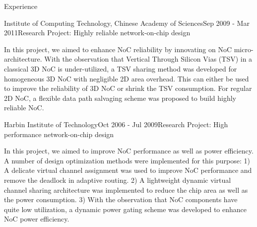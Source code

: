 \documentclass{resume} %
\begin{document}
\begin{rSection}{Experience}

\begin{rSubsection}{Institute of Computing Technology, Chinese Academy of Sciences}{Sep 2009 - Mar 2011}{Research Project: Highly reliable network-on-chip design}{}
\item In this project, we aimed to enhance NoC reliability by innovating on NoC micro-architecture. With
    the observation that Vertical Through Silicon Vias (TSV) in a classical 3D NoC is
    under-utilized, a TSV sharing method was developed for homogeneous 3D NoC with negligible 2D area
    overhead. This can either be used to improve the reliability of 3D NoC or shrink the TSV consumption.
    For regular 2D NoC, a flexible data path salvaging scheme was proposed to build highly reliable NoC.

\end{rSubsection}


\begin{rSubsection}{Harbin Institute of Technology}{Oct 2006 - Jul 2009}{Research Project: High performance network-on-chip design}{}
\item In this project, we aimed to improve NoC performance as well as power efficiency. A number of design
optimization methods were implemented for this purpose: 1) A delicate virtual channel assignment was
used to improve NoC performance and remove the deadlock in adaptive routing. 2) A lightweight
dynamic virtual channel sharing architecture was implemented to reduce the chip area as well as the
power consumption. 3) With the observation that NoC components have quite low utilization, a dynamic
power gating scheme was developed to enhance NoC power efficiency.
\end{rSubsection}

\end{rSection}
\end{document}
